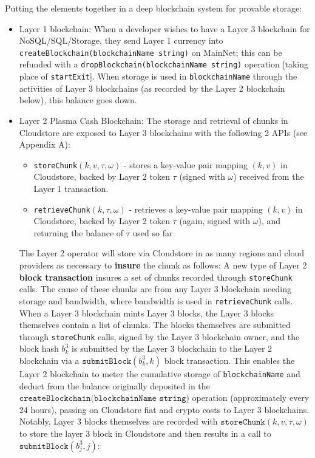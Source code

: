 \documentclass{article}
\newcommand{\blockhash}[2]{b^{#1}_{#2}}
\newcommand{\signature}{\omega}
\newcommand{\submitblock}[2]{\texttt{submitBlock}(#2, #1)}
\begin{document}
Putting the elements together in a deep blockchain system for provable storage:
\begin{itemize}
\item Layer 1 blockchain: When a developer wishes to have a Layer 3 blockchain for NoSQL/SQL/Storage, they send Layer 1 currency into \texttt{createBlockchain(blockchainName string)} on MainNet; this can be refunded with a {\tt dropBlockchain(blockchainName string)} operation [taking place of {\tt startExit}].  When storage is used in {\tt blockchainName} through the activities of Layer 3 blockchains (as recorded by the Layer 2 blockchain below), this balance goes down.

\item Layer 2 Plasma Cash Blockchain: The storage and retrieval of chunks in Cloudstore are exposed to Layer 3 blockchains with the following 2 APIs (see Appendix A):
\begin{itemize}
    \item \texttt{storeChunk}$(k, v, \tau, \signature)$ - stores a key-value pair mapping $(k,v)$ in Cloudstore, backed by Layer 2 token $\tau$ (signed with $\signature$) received from the Layer 1 transaction.
    \item \texttt{retrieveChunk}$(k, \tau, \signature)$ - retrieves a key-value pair mapping $(k,v)$ in Cloudstore, backed by Layer 2 token $\tau$ (again, signed with $\signature$), and returning the balance of $\tau$ used so far
\end{itemize}
The Layer 2 operator will store via Cloudstore in as many regions and cloud providers as necessary to {\bf insure} the chunk as follows:  A new type of Layer 2 {\bf block transaction} insures a set of chunks recorded through \texttt{storeChunk} calls.  The cause of these chunks are from any Layer 3 blockchain needing storage and bandwidth, where bandwidth is used in \texttt{retrieveChunk} calls.  When a Layer 3 blockchain mints Layer 3 blocks, the Layer 3 blocks themselves contain a list of chunks.  The blocks themselves are submitted through \texttt{storeChunk} calls, signed by the Layer 3 blockchain owner, and the block hash $\blockhash{3}{k}$ is submitted by the Layer 3 blockchain to the Layer 2 blockchain via a $\submitblock{k}{\blockhash{3}{k}}$ block transaction.  This enables the Layer 2 blockchain to meter the cumulative storage of {\tt blockchainName} and deduct from the balance originally deposited in the $\texttt{createBlockchain(blockchainName string)}$ operation (approximately every 24 hours), passing on Cloudstore fiat and crypto costs to Layer 3 blockchains.  Notably, Layer 3 blocks themselves are recorded with $\texttt{storeChunk}(k, v, \tau, \signature)$ to store the layer 3 block in Cloudstore and then results in a call to $\submitblock{j}{\blockhash{3}{j}}$:

\end{itemize}
\end{document}
